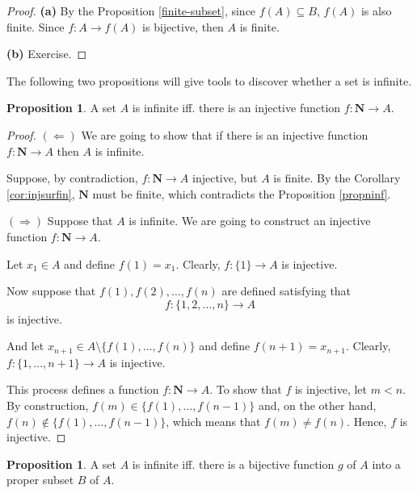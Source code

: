 \documentclass[12pt,a4paper]{article}
\theoremstyle{definition}
\newtheorem{proposition}[theorem]{Proposition}
\begin{document}
\begin{proof}
	\textbf{(a)} By the Proposition \ref{finite-subset}, since $f(A) \subseteq B$, $f(A)$ is also finite. Since $f : A \longrightarrow f(A)$ is bijective, then $A$ is finite.

	\textbf{(b)} Exercise.
\end{proof}

The following two propositions will give tools to discover whether a set is infinite.

\begin{proposition}\label{infprop1}
	A set $A$ is infinite iff. there is an injective function $f : \textbf{N} \longrightarrow A$.
\end{proposition}

\begin{proof}
	$(\Leftarrow)$ We are going to show that if there is an injective function $f : \textbf{N} \longrightarrow A$ then $A$ is infinite.
	
	Suppose, by contradiction, $f : \textbf{N} \longrightarrow A$ injective, but $A$ is finite. By the Corollary \ref{cor:injsurfin}, $\textbf{N}$ must be finite, which contradicts the Proposition \ref{propninf}.
	
	$(\Rightarrow)$ Suppose that $A$ is infinite. We are going to construct an injective function $f : \textbf{N} \longrightarrow A$.
	
	Let $x_1 \in A$ and define $f(1) = x_1$. Clearly, $f : \{1\} \longrightarrow A$ is injective.
	
	Now suppose that $f(1), f(2), \ldots, f(n)$ are defined satisfying that \[f : \{ 1, 2, \ldots, n \} \longrightarrow A\] is injective.
	
	And let $x_{n+1} \in A \setminus \{f(1), \ldots, f(n) \}$ and define $f(n+1) = x_{n+1}$. Clearly, $f : \{ 1, \ldots, n+1 \} \longrightarrow A$ is injective.
	
	This process defines a function $f : \textbf{N} \longrightarrow A$. To show that $f$ is injective, let $m < n$. By construction, $f(m) \in \{ f(1), \ldots, f(n-1) \}$ and, on the other hand, $f(n) \notin \{ f(1), \ldots, f(n-1) \}$, which means that $f(m) \neq f(n)$. Hence, $f$ is injective.
\end{proof}

\begin{proposition}\label{infprop2}
	A set $A$ is infinite iff. there is a bijective function $g$ of $A$ into a proper subset $B$ of $A$.
\end{proposition}
\end{document}
